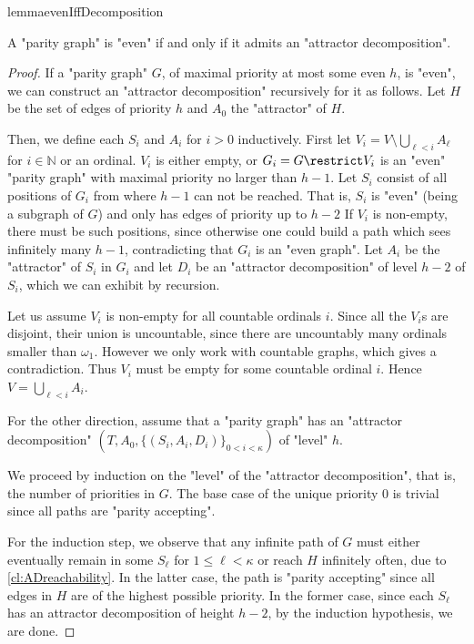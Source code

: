 \documentclass[a4paper,UKenglish,cleveref, autoref, thm-restate]{lipics-v2021}
\newcommand{\NN}{\mathbb{N}}
\renewcommand{\leq}{\leqslant}
\begin{document}
\begin{restatable}{lemma}{evenIffDecomposition}\label{cl:EvenIffDecomposition}
	
	A "parity graph" is "even" if and only if it admits an "attractor decomposition".
	
	
\end{restatable}

\begin{proof}
	If a "parity graph" $G$, of maximal priority at most some even $h$, is "even", we can construct an "attractor decomposition" recursively for it as follows.
	Let $H$ be the set of edges of priority $h$ and $A_0$ the "attractor" of $H$. 
	
	Then, we define each $S_i$ and $A_i$ for $i>0$ inductively. First let $V_i=V\setminus \bigcup_{\ell< i} A_\ell$ for $i\in \NN$  or an ordinal.
	$V_i$ is either empty, or $G_i=G\restrict V_i$ is an "even" "parity graph" with maximal priority no larger than $h{-}1$. Let $S_i$ consist of all positions of $G_i$ from where $h{-}1$ can not be reached. That is, $S_i$ is "even" (being a subgraph of $G$) and only has edges of priority up to $h-2$
	If $V_i$ is non-empty, there must be such positions, since otherwise one could build a path which sees infinitely many $h{-}1$, contradicting that $G_i$ is an "even graph". Let $A_i$ be the "attractor" of $S_i$ in $G_i$ and let $D_i$ be an "attractor decomposition" of level $h{-}2$ of $S_i$, which we can exhibit by recursion.
	
	
	Let us assume $V_i$ is non-empty for all countable ordinals $i$. Since all the $V_i$s are disjoint, their union is uncountable, since there are uncountably many ordinals smaller than $\omega_1$. However we only work with countable graphs, which gives a contradiction. Thus $V_i$ must be empty for some countable ordinal $i$. Hence $V=\bigcup_{\ell <i}A_i$.
	
	
	
	For the other direction, assume that a "parity graph" has an "attractor decomposition" $(T, A_0,\{(S_i,A_i,D_i)\}_{0<i<\kappa})$ of "level" $h$.
	
	We proceed by induction on the "level" of the "attractor decomposition", that is, the number of priorities in $G$. The base case of the unique priority $0$ is trivial since all paths are "parity accepting".
	
	For the induction step, we observe that any infinite path of $G$ must either eventually remain in some $S_\ell$ for $1\leq \ell< \kappa$ or reach $H$ infinitely often, due to \cref{cl:ADreachability}. In the latter case, the path is "parity accepting" since all edges in $H$ are of the highest possible priority. In the former case, since each $S_\ell$ has an attractor decomposition of height $h{-}2$, by the induction hypothesis, we are done. \qedhere
	
\end{proof}
\end{document}
